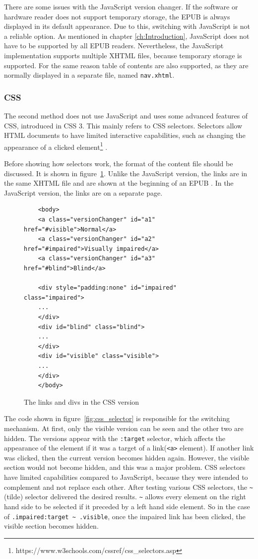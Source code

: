 There are some issues with the JavaScript version changer. If the software or hardware reader does not support temporary storage, the EPUB is always displayed in its default appearance. Due to this, switching with JavaScript is not a reliable option. As mentioned in chapter \ref{ch:Introduction}, JavaScript does not have to be supported by all EPUB readers. Nevertheless, the JavaScript implementation supports multiple XHTML files, because temporary storage is supported. For the same reason table of contents are also supported, as they are normally displayed in a separate file, named \lstinline|nav.xhtml|. 

\subsubsection{CSS}
The second method does not use JavaScript and uses some advanced features of CSS, introduced in CSS 3. This mainly refers to CSS selectors. Selectors allow HTML documents to have limited interactive capabilities, such as changing the appearance of a clicked element\footnote{https://www.w3schools.com/cssref/css\_selectors.asp} \cite{cssSelectors}.

Before showing how selectors work, the format of the content file should be discussed. It is shown in figure~\ref{fig:css_switch}. Unlike the JavaScript version, the links are in the same XHTML file and are shown at the beginning of an EPUB . In the JavaScript version, the links are on a separate page.


\begin{figure}
	
	\begin{lstlisting}
	<body>
	<a class="versionChanger" id="a1" href="#visible">Normal</a>
	<a class="versionChanger" id="a2" href="#impaired">Visually impaired</a>
	<a class="versionChanger" id="a3" href="#blind">Blind</a>
	
	<div style="padding:none" id="impaired" class="impaired">
	...
	</div>
	<div id="blind" class="blind">
	...
	</div>
	<div id="visible" class="visible">
	...
	</div>
	</body>
	\end{lstlisting}
	\caption{The links and divs in the CSS version}
	\label{fig:css_switch}
\end{figure}

The code shown in figure~\ref{fig:css_selector} is responsible for the switching mechanism. At first, only the visible version can be seen and the other two are hidden. The versions appear with the \lstinline|:target| selector, which affects the appearance of the element if it was a target of a link(\lstinline|<a>| element). If another link was clicked, then the current version becomes hidden again. However, the visible section would not become hidden, and this was a major problem. CSS selectors have limited capabilities compared to JavaScript, because they were intended to complement and not replace each other. After testing various CSS selectors, the \lstinline|~| (tilde) selector delivered the desired results. \lstinline|~| allows every element on the right hand side to be selected if it preceded by a left hand side element. So in the case of \lstinline|.impaired:target ~ .visible|, once the impaired link has been clicked, the visible section becomes hidden.


